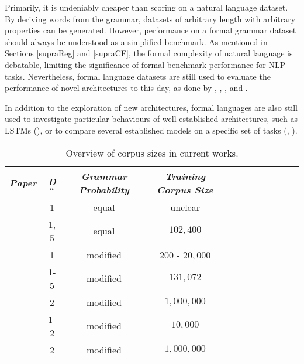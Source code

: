 Primarily, it is undeniably cheaper than scoring on a natural language dataset. By deriving words from the grammar, datasets of arbitrary length with arbitrary properties can be generated. However, performance on a formal grammar dataset should always be understood as a simplified benchmark. As mentioned in Sections \ref{supraReg} and \ref{supraCF}, the formal complexity of natural language is debatable, limiting the significance of formal benchmark performance for NLP tasks. Nevertheless, formal language datasets are still used to evaluate the performance of novel architectures to this day, as done by \cite{Joulin2015}, \cite{Bernardy2018}, \cite{Deleu2016}, \cite{Li2018} and \cite{Yu2019}.

In addition to the exploration of new architectures, formal languages are also still used to investigate particular behaviours of well-established architectures, such as LSTMs (\cite{Sennhauser2018}), or to compare several established models on a specific set of tasks (\cite{Skachkova2018}, \cite{Suzgun2019}).
\begin{table}
	\begin{tabularx}{\textwidth}{@{}l*{10}{C}c@{}}
		\toprule 		
		\textit{Paper} & \textit{D$_n$} & \textit{Grammar Probability} & \textit{Training Corpus Size} \\ 
		\toprule
		\cite{Deleu2016} & 1 & equal & unclear \\ 
		\cite{Bernardy2018} & 1, 5 & equal & $102,400$ \\ 
		\cite{Li2018} & 1 & modified & $200$ - $20,000$ \\ 
		\cite{Skachkova2018} & 1-5 & modified & $131,072$ \\ 
		\cite{Sennhauser2018} & 2 & modified & $1,000,000$ \\ 
		\cite{Suzgun2019} & 1-2 & modified & $10,000$ \\ 
		\cite{Yu2019} & 2 & modified & $1,000,000$ \\ 
		\bottomrule
	\end{tabularx}
	\caption[Corpus sizes in current works]{Overview of corpus sizes in current works.}
	\label{tab:LiteratureCorpusOverview}
\end{table}
